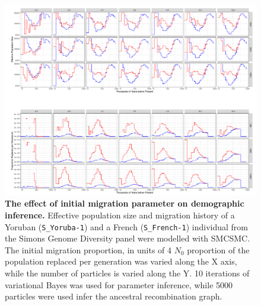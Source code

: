 \begin{figure}
	\centering
	\includegraphics[width=\textwidth]{plot/yri_dif_migs.pdf}
	\caption[The effect of initial mirgation on demographic inference]{ {\bf The effect of initial migration parameter on demographic inference.} Effective population size and migration history of a Yoruban ({\tt S\_Yoruba-1}) and a French ({\tt S\_French-1}) individual from the Simons Genome Diversity panel were modelled with SMCSMC. The initial migration proportion, in units of 4 $N_0$ proportion of the population replaced per generation was varied along the X axis, while the number of particles is varied along the Y. 10 iterations of variational Bayes was used for parameter inference, while 5000 particles were used infer the ancestral recombination graph.}
	\label{fig:init_yri}
\end{figure}

\minitoc

